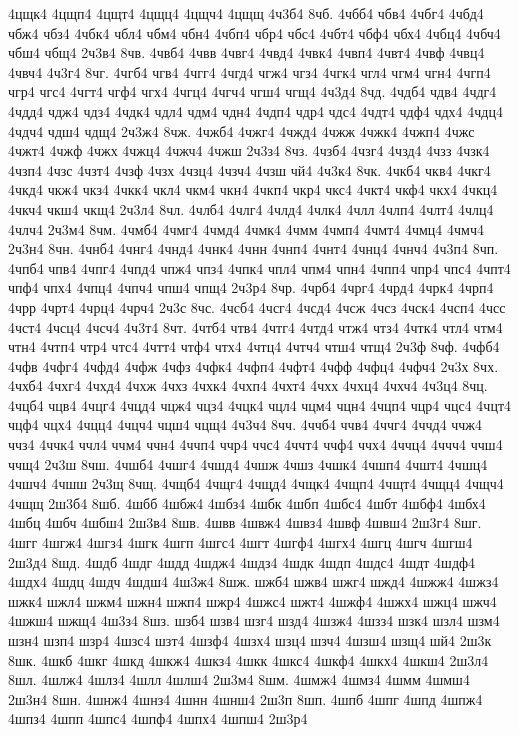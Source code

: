 {4цщк4
4цщп4
4цщт4
4цщц4
4цщч4
4цщщ
4ч3б4
8чб.
4чбб4
чбв4
4чбг4
4чбд4
чбж4
чбз4
4чбк4
чбл4
чбм4
чбн4
4чбп4
чбр4
чбс4
4чбт4
чбф4
чбх4
4чбц4
4чбч4
чбш4
чбщ4
2ч3в4
8чв.
4чвб4
4чвв
4чвг4
4чвд4
4чвк4
4чвп4
4чвт4
4чвф
4чвц4
4чвч4
4ч3г4
8чг.
4чгб4
чгв4
4чгг4
4чгд4
чгж4
чгз4
4чгк4
чгл4
чгм4
чгн4
4чгп4
чгр4
чгс4
4чгт4
чгф4
чгх4
4чгц4
4чгч4
чгш4
чгщ4
4ч3д4
8чд.
4чдб4
чдв4
4чдг4
4чдд4
чдж4
чдз4
4чдк4
чдл4
чдм4
чдн4
4чдп4
чдр4
чдс4
4чдт4
чдф4
чдх4
4чдц4
4чдч4
чдш4
чдщ4
2ч3ж4
8чж.
4чжб4
4чжг4
4чжд4
4чжж
4чжк4
4чжп4
4чжс
4чжт4
4чжф
4чжх
4чжц4
4чжч4
4чжш
2ч3з4
8чз.
4чзб4
4чзг4
4чзд4
4чзз
4чзк4
4чзп4
4чзс
4чзт4
4чзф
4чзх
4чзц4
4чзч4
4чзш
чй4
4ч3к4
8чк.
4чкб4
чкв4
4чкг4
4чкд4
чкж4
чкз4
4чкк4
чкл4
чкм4
чкн4
4чкп4
чкр4
чкс4
4чкт4
чкф4
чкх4
4чкц4
4чкч4
чкш4
чкщ4
2ч3л4
8чл.
4члб4
4члг4
4члд4
4члк4
4члл
4члп4
4члт4
4члц4
4члч4
2ч3м4
8чм.
4чмб4
4чмг4
4чмд4
4чмк4
4чмм
4чмп4
4чмт4
4чмц4
4чмч4
2ч3н4
8чн.
4чнб4
4чнг4
4чнд4
4чнк4
4чнн
4чнп4
4чнт4
4чнц4
4чнч4
4ч3п4
8чп.
4чпб4
чпв4
4чпг4
4чпд4
чпж4
чпз4
4чпк4
чпл4
чпм4
чпн4
4чпп4
чпр4
чпс4
4чпт4
чпф4
чпх4
4чпц4
4чпч4
чпш4
чпщ4
2ч3р4
8чр.
4чрб4
4чрг4
4чрд4
4чрк4
4чрп4
4чрр
4чрт4
4чрц4
4чрч4
2ч3с
8чс.
4чсб4
4чсг4
4чсд4
4чсж
4чсз
4чск4
4чсп4
4чсс
4чст4
4чсц4
4чсч4
4ч3т4
8чт.
4чтб4
чтв4
4чтг4
4чтд4
чтж4
чтз4
4чтк4
чтл4
чтм4
чтн4
4чтп4
чтр4
чтс4
4чтт4
чтф4
чтх4
4чтц4
4чтч4
чтш4
чтщ4
2ч3ф
8чф.
4чфб4
4чфв
4чфг4
4чфд4
4чфж
4чфз
4чфк4
4чфп4
4чфт4
4чфф
4чфц4
4чфч4
2ч3х
8чх.
4чхб4
4чхг4
4чхд4
4чхж
4чхз
4чхк4
4чхп4
4чхт4
4чхх
4чхц4
4чхч4
4ч3ц4
8чц.
4чцб4
чцв4
4чцг4
4чцд4
чцж4
чцз4
4чцк4
чцл4
чцм4
чцн4
4чцп4
чцр4
чцс4
4чцт4
чцф4
чцх4
4чцц4
4чцч4
чцш4
чцщ4
4ч3ч4
8чч.
4ччб4
ччв4
4ччг4
4ччд4
ччж4
ччз4
4ччк4
ччл4
ччм4
ччн4
4ччп4
ччр4
ччс4
4ччт4
ччф4
ччх4
4ччц4
4ччч4
ччш4
ччщ4
2ч3ш
8чш.
4чшб4
4чшг4
4чшд4
4чшж
4чшз
4чшк4
4чшп4
4чшт4
4чшц4
4чшч4
4чшш
2ч3щ
8чщ.
4чщб4
4чщг4
4чщд4
4чщк4
4чщп4
4чщт4
4чщц4
4чщч4
4чщщ
2ш3б4
8шб.
4шбб
4шбж4
4шбз4
4шбк
4шбп
4шбс4
4шбт
4шбф4
4шбх4
4шбц
4шбч
4шбш4
2ш3в4
8шв.
4швв
4швж4
4швз4
4швф
4швш4
2ш3г4
8шг.
4шгг
4шгж4
4шгз4
4шгк
4шгп
4шгс4
4шгт
4шгф4
4шгх4
4шгц
4шгч
4шгш4
2ш3д4
8шд.
4шдб
4шдг
4шдд
4шдж4
4шдз4
4шдк
4шдп
4шдс4
4шдт
4шдф4
4шдх4
4шдц
4шдч
4шдш4
4ш3ж4
8шж.
шжб4
шжв4
шжг4
шжд4
4шжж4
4шжз4
шжк4
шжл4
шжм4
шжн4
шжп4
шжр4
4шжс4
шжт4
4шжф4
4шжх4
шжц4
шжч4
4шжш4
шжщ4
4ш3з4
8шз.
шзб4
шзв4
шзг4
шзд4
4шзж4
4шзз4
шзк4
шзл4
шзм4
шзн4
шзп4
шзр4
4шзс4
шзт4
4шзф4
4шзх4
шзц4
шзч4
4шзш4
шзщ4
шй4
2ш3к
8шк.
4шкб
4шкг
4шкд
4шкж4
4шкз4
4шкк
4шкс4
4шкф4
4шкх4
4шкш4
2ш3л4
8шл.
4шлж4
4шлз4
4шлл
4шлш4
2ш3м4
8шм.
4шмж4
4шмз4
4шмм
4шмш4
2ш3н4
8шн.
4шнж4
4шнз4
4шнн
4шнш4
2ш3п
8шп.
4шпб
4шпг
4шпд
4шпж4
4шпз4
4шпп
4шпс4
4шпф4
4шпх4
4шпш4
2ш3р4
}
